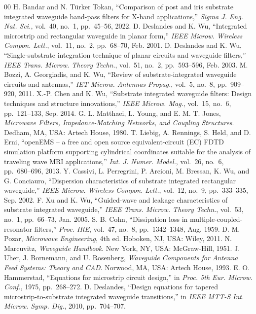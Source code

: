 \documentclass[conference]{IEEEtran}
\begin{document}
\begin{thebibliography}{00}
 H. Bandar and N. T\"urker Tokan, ``Comparison of post and iris substrate integrated waveguide band-pass filters for X-band applications,'' \textit{Sigma J. Eng. Nat. Sci.}, vol.~40, no.~1, pp.~45--56, 2022.
 D. Deslandes and K. Wu, ``Integrated microstrip and rectangular waveguide in planar form,'' \textit{IEEE Microw. Wireless Compon. Lett.}, vol.~11, no.~2, pp.~68--70, Feb. 2001.
 D. Deslandes and K. Wu, ``Single-substrate integration technique of planar circuits and waveguide filters,'' \textit{IEEE Trans. Microw. Theory Techn.}, vol.~51, no.~2, pp.~593--596, Feb. 2003.
 M. Bozzi, A. Georgiadis, and K. Wu, ``Review of substrate-integrated waveguide circuits and antennas,'' \textit{IET Microw. Antennas Propag.}, vol.~5, no.~8, pp.~909--920, 2011.
 X.-P. Chen and K. Wu, ``Substrate integrated waveguide filters: Design techniques and structure innovations,'' \textit{IEEE Microw. Mag.}, vol.~15, no.~6, pp.~121--133, Sep. 2014.
 G. L. Matthaei, L. Young, and E. M. T. Jones, \textit{Microwave Filters, Impedance-Matching Networks, and Coupling Structures}. Dedham, MA, USA: Artech House, 1980.
 T. Liebig, A. Rennings, S. Held, and D. Erni, ``openEMS -- a free and open source equivalent-circuit (EC) FDTD simulation platform supporting cylindrical coordinates suitable for the analysis of traveling wave MRI applications,'' \textit{Int. J. Numer. Model.}, vol.~26, no.~6, pp.~680--696, 2013.
 Y. Cassivi, L. Perregrini, P. Arcioni, M. Bressan, K. Wu, and G. Conciauro, ``Dispersion characteristics of substrate integrated rectangular waveguide,'' \textit{IEEE Microw. Wireless Compon. Lett.}, vol.~12, no.~9, pp.~333--335, Sep. 2002.
 F. Xu and K. Wu, ``Guided-wave and leakage characteristics of substrate integrated waveguide,'' \textit{IEEE Trans. Microw. Theory Techn.}, vol.~53, no.~1, pp.~66--73, Jan. 2005.
 S. B. Cohn, ``Dissipation loss in multiple-coupled-resonator filters,'' \textit{Proc. IRE}, vol.~47, no.~8, pp.~1342--1348, Aug. 1959.
 D. M. Pozar, \textit{Microwave Engineering}, 4th ed. Hoboken, NJ, USA: Wiley, 2011.
 N. Marcuvitz, \textit{Waveguide Handbook}. New York, NY, USA: McGraw-Hill, 1951.
 J. Uher, J. Bornemann, and U. Rosenberg, \textit{Waveguide Components for Antenna Feed Systems: Theory and CAD}. Norwood, MA, USA: Artech House, 1993.
 E. O. Hammerstad, ``Equations for microstrip circuit design,'' in \textit{Proc. 5th Eur. Microw. Conf.}, 1975, pp.~268--272.
 D. Deslandes, ``Design equations for tapered microstrip-to-substrate integrated waveguide transitions,'' in \textit{IEEE MTT-S Int. Microw. Symp. Dig.}, 2010, pp.~704--707.
\end{thebibliography}
\end{document}
